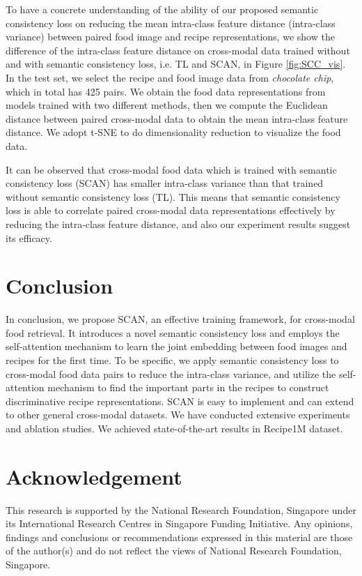 \documentclass[journal]{IEEEtran}
\begin{document}
To have a concrete understanding of the ability of our proposed semantic consistency loss on reducing the mean intra-class feature distance (intra-class variance) between paired food image and recipe representations, we show the difference of the intra-class feature distance on cross-modal data trained without and with semantic consistency loss, i.e. TL and SCAN, in Figure \ref{fig:SCC_vis}. In the test set, we select the recipe and food image data from \emph{chocolate chip}, which in total has 425 pairs. We obtain the food data representations from models trained with two different methods, then we compute the Euclidean distance between paired cross-modal data to obtain the mean intra-class feature distance. We adopt t-SNE \cite{maaten2008visualizing} to do dimensionality reduction to visualize the food data.

It can be observed that cross-modal food data which is trained with semantic consistency loss (SCAN) has smaller intra-class variance than that trained without semantic consistency loss (TL). This means that semantic consistency loss is able to correlate paired cross-modal data representations effectively by reducing the intra-class feature distance, and also our experiment results suggest its efficacy.



\section{Conclusion}

In conclusion, we propose SCAN, an effective training framework, for cross-modal food retrieval. It introduces a novel semantic consistency loss and employs the self-attention mechanism to learn the joint embedding between food images and recipes for the first time. To be specific, we apply semantic consistency loss to cross-modal food data pairs to reduce the intra-class variance, and utilize the self-attention mechanism to find the important parts in the recipes to construct discriminative recipe representations. SCAN is easy to implement and can extend to other general cross-modal datasets. We have conducted extensive experiments and ablation studies. We achieved state-of-the-art results in Recipe1M dataset.

\section*{Acknowledgement}
This research is supported by the National Research Foundation, Singapore under its International Research Centres in Singapore Funding Initiative. Any opinions, findings and conclusions or recommendations expressed in this material are those of the author(s) and do not reflect the views of National Research Foundation, Singapore.
\end{document}
